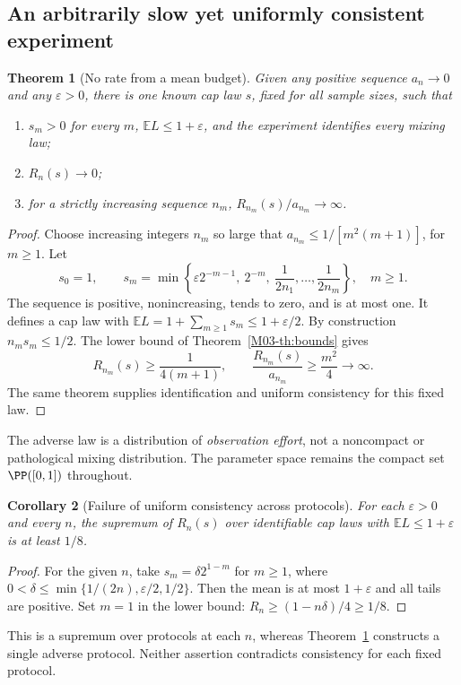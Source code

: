 \documentclass[11pt,a4paper]{article}
\newtheorem{theorem}{Theorem}[section]
\newtheorem{corollary}[theorem]{Corollary}
\theoremstyle{definition}\newtheorem{definition}[theorem]{Definition}
\theoremstyle{remark}\newtheorem{remark}[theorem]{Remark}
\newcommand{\E}{\mathbb E}\newcommand{\one}{\mathbf 1}\newcommand{\1}{\mathbf 1}
\numberwithin{equation}{section}
\begin{document}
\subsection{An arbitrarily slow yet uniformly consistent experiment}\label{M03-sec-4}
\begin{theorem}[No rate from a mean budget]\label{M03-th:slow}
Given any positive sequence $a_n\to0$ and any $\varepsilon>0$, there is one known cap law $s$, fixed for all sample sizes, such that
\begin{enumerate}[label=(\roman*)]
\item $s_m>0$ for every $m$, $\E L\le1+\varepsilon$, and the experiment identifies every mixing law;
\item $R_n(s)\to0$;
\item for a strictly increasing sequence $n_m$, $R_{n_m}(s)/a_{n_m}\to\infty$.
\end{enumerate}
\end{theorem}
\begin{proof}
Choose increasing integers $n_m$ so large that
$a_{n_m}\le1/[m^2(m+1)]$, for $m\ge1$. Let
\[
 s_0=1,\qquad
 s_m=\min\left\{\varepsilon2^{-m-1},\ 2^{-m},\
                    \frac1{2n_1},\ldots,\frac1{2n_m}\right\},\quad m\ge1.
\]
The sequence is positive, nonincreasing, tends to zero, and is at most one. It defines a cap law with
$\E L=1+\sum_{m\ge1}s_m\le1+\varepsilon/2$.
By construction $n_ms_m\le1/2$. The lower bound of Theorem~\ref{M03-th:bounds} gives
\[
 R_{n_m}(s)\ge\frac1{4(m+1)},\qquad
 \frac{R_{n_m}(s)}{a_{n_m}}\ge\frac{m^2}{4}\longrightarrow\infty.
\]
The same theorem supplies identification and uniform consistency for this fixed law.
\end{proof}
The adverse law is a distribution of \emph{observation effort}, not a noncompact or pathological mixing distribution. The parameter space remains the compact set $\PP([0,1])$ throughout.

\begin{corollary}[Failure of uniform consistency across protocols]
For each $\varepsilon>0$ and every $n$, the supremum of $R_n(s)$ over identifiable cap laws with $\E L\le1+\varepsilon$ is at least $1/8$.
\end{corollary}
\begin{proof}
For the given $n$, take $s_m=\delta2^{1-m}$ for $m\ge1$, where $0<\delta\le\min\{1/(2n),\varepsilon/2,1/2\}$. Then the mean is at most $1+\varepsilon$ and all tails are positive. Set $m=1$ in the lower bound: $R_n\ge(1-n\delta)/4\ge1/8$.
\end{proof}
This is a supremum over protocols at each $n$, whereas Theorem~\ref{M03-th:slow} constructs a single adverse protocol. Neither assertion contradicts consistency for each fixed protocol.
\end{document}
